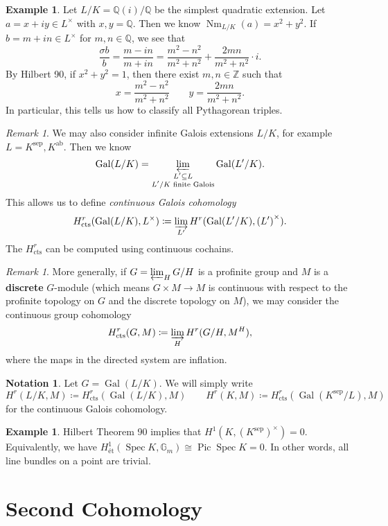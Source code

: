 \documentclass[leqno, openany]{memoir}
\theoremstyle{definition}
\newtheorem{exm}[thm]{Example}
\newtheorem{notn}[thm]{Notation}
\theoremstyle{remark}
\newtheorem{rmk}[thm]{Remark}
\theoremstyle{plain}
\theoremstyle{definition}
\theoremstyle{remark}
\newcommand{\Z}{\mathbb{Z}}
\newcommand{\Q}{\mathbb{Q}}
\newcommand{\mr}[1]{\mathrm{#1}}
\DeclareMathOperator{\Gal}{Gal}
\DeclareMathOperator{\Spec}{Spec}
\DeclareMathOperator{\Pic}{Pic}
\DeclareMathOperator{\Nm}{Nm}
\begin{document}
\begin{exm} Let $L/K = \Q(i)/\Q$ be the simplest quadratic extension. Let $a =
    x+iy \in L^{\times}$ with $x,y = \Q$. Then we know $\Nm_{L/K}(a) = x^2 +
    y^2$. If $b = m + in \in L^{\times}$ for $m,n \in \Q$, we see that \[
    \frac{\sigma b}{b} = \frac{m-in}{m+in} = \frac{m^2-n^2}{m^2+n^2} +
\frac{2mn}{m^2+n^2} \cdot i. \] By Hilbert 90, if $x^2 + y^2 = 1$, then there
exist $m,n \in \Z$ such that \[ x = \frac{m^2 - n^2}{m^2 + n^2} \qquad y =
\frac{2mn}{m^2 + n^2}. \] In particular, this tells us how to classify all
Pythagorean triples.  \end{exm}

\begin{rmk} We may also consider infinite Galois extensions $L/K$, for example
    $L = K^{\mr{sep}}, K^{\mr{ab}}$. Then we know \[ \Gal(L/K) =
    \varprojlim_{\substack{L' \subseteq L \\ \text{$L'/K$ finite Galois}}}
\Gal(L'/K). \] This allows us to define \textit{continuous Galois cohomology}
\[ H^r_{\mr{cts}}(\Gal(L/K), L^{\times}) \coloneqq \varinjlim_{L'}
H^r(\Gal(L'/K), {(L')}^{\times}). \] The $H^r_{\mr{cts}}$ can be computed using
continuous cochains.  \end{rmk}

\begin{rmk} More generally, if $G = \varprojlim_{H} G/H$ is a profinite group
    and $M$ is a \textbf{discrete} $G$-module (which means $G \times M \to M$
    is continuous with respect to the profinite topology on $G$ and the
    discrete topology on $M$), we may consider the continuous group cohomology
    \[ H^r_{\mr{cts}}(G, M) \coloneqq \varinjlim_H H^r(G/H, M^H), \] where the
maps in the directed system are inflation.  \end{rmk}

\begin{notn} Let $G = \Gal(L/K)$. We will simply write \[ H^r(L/K, M) \coloneqq
H^r_{\mr{cts}}(\Gal(L/K), M) \qquad H^r(K, M) \coloneqq
H^r_{\mr{cts}}(\Gal(K^{\mr{sep}}/L), M) \] for the continuous Galois
cohomology.  \end{notn}

\begin{exm} Hilbert Theorem 90 implies that $H^1(K, {(K^{\mr{sep}})}^{\times})
= 0$. Equivalently, we have $H^1_{\text{\'et}}(\Spec K, \mathbb{G}_m) \cong
\Pic \Spec K = 0$. In other words, all line bundles on a point are trivial.
\end{exm}

\section{Second Cohomology}%
\end{document}
